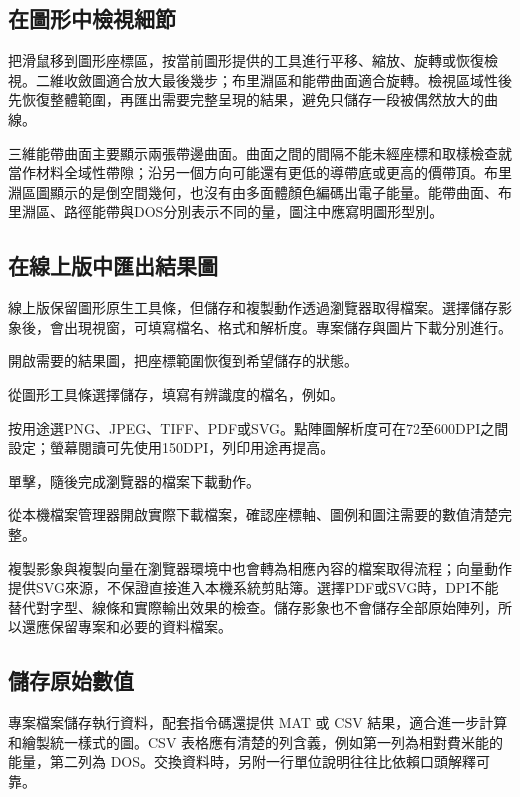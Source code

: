 \subsection{在圖形中檢視細節}

把滑鼠移到圖形座標區，按當前圖形提供的工具進行平移、縮放、旋轉或恢復檢視。二維收斂圖適合放大最後幾步；布里淵區和能帶曲面適合旋轉。檢視區域性後先恢復整體範圍，再匯出需要完整呈現的結果，避免只儲存一段被偶然放大的曲線。

三維能帶曲面主要顯示兩張帶邊曲面。曲面之間的間隔不能未經座標和取樣檢查就當作材料全域性帶隙；沿另一個方向可能還有更低的導帶底或更高的價帶頂。布里淵區圖顯示的是倒空間幾何，也沒有由多面體顏色編碼出電子能量。能帶曲面、布里淵區、路徑能帶與DOS分別表示不同的量，圖注中應寫明圖形型別。

\subsection{在線上版中匯出結果圖}

線上版保留圖形原生工具條，但儲存和複製動作透過瀏覽器取得檔案。選擇儲存影象後，會出現視窗，可填寫檔名、格式和解析度。專案儲存與圖片下載分別進行。

\begin{steps}
\item 開啟需要的結果圖，把座標範圍恢復到希望儲存的狀態。
\item 從圖形工具條選擇儲存，填寫有辨識度的檔名，例如。
\item 按用途選PNG、JPEG、TIFF、PDF或SVG。點陣圖解析度可在72至600DPI之間設定；螢幕閱讀可先使用150DPI，列印用途再提高。
\item 單擊，隨後完成瀏覽器的檔案下載動作。
\item 從本機檔案管理器開啟實際下載檔案，確認座標軸、圖例和圖注需要的數值清楚完整。
\end{steps}

複製影象與複製向量在瀏覽器環境中也會轉為相應內容的檔案取得流程；向量動作提供SVG來源，不保證直接進入本機系統剪貼簿。選擇PDF或SVG時，DPI不能替代對字型、線條和實際輸出效果的檢查。儲存影象也不會儲存全部原始陣列，所以還應保留專案和必要的資料檔案。


\subsection{儲存原始數值}

專案檔案儲存執行資料，配套指令碼還提供 MAT 或 CSV 結果，適合進一步計算和繪製統一樣式的圖。CSV 表格應有清楚的列含義，例如第一列為相對費米能的能量，第二列為 DOS。交換資料時，另附一行單位說明往往比依賴口頭解釋可靠。

